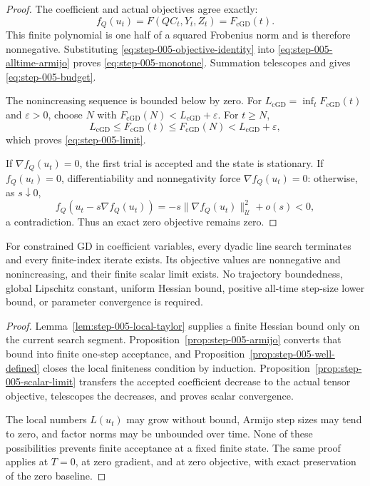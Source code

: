 \begin{proof}
The coefficient and actual objectives agree exactly:
\[
 f_Q(u_t)=F(QC_t,Y_t,Z_t)=F_{\mathrm{cGD}}(t).
 \tag{A.7}\label{eq:step-005-objective-identity}
\]
This finite polynomial is one half of a squared Frobenius norm and is
therefore nonnegative.  Substituting
\eqref{eq:step-005-objective-identity} into
\eqref{eq:step-005-alltime-armijo} proves
\eqref{eq:step-005-monotone}.  Summation telescopes and gives
\eqref{eq:step-005-budget}.

The nonincreasing sequence is bounded below by zero.  For
$L_{\mathrm{cGD}}=\inf_tF_{\mathrm{cGD}}(t)$ and $\varepsilon>0$, choose
$N$ with
$F_{\mathrm{cGD}}(N)<L_{\mathrm{cGD}}+\varepsilon$.  For $t\ge N$,
\[
 L_{\mathrm{cGD}}\le F_{\mathrm{cGD}}(t)
 \le F_{\mathrm{cGD}}(N)<L_{\mathrm{cGD}}+\varepsilon,
\]
which proves \eqref{eq:step-005-limit}.

If $\nabla f_Q(u_t)=0$, the first trial is accepted and the state is
stationary.  If $f_Q(u_t)=0$, differentiability and nonnegativity force
$\nabla f_Q(u_t)=0$: otherwise, as $s\downarrow0$,
\[
 f_Q(u_t-s\nabla f_Q(u_t))
 =-s\|\nabla f_Q(u_t)\|_{\mathcal U}^2+o(s)<0,
\]
a contradiction.  Thus an exact zero objective remains zero.
\end{proof}

\begin{proposition}\label{prop:step-005-certificate}
For constrained GD in coefficient variables, every dyadic line search
terminates and every finite-index iterate exists.  Its objective values are
nonnegative and nonincreasing, and their finite scalar limit exists.  No
trajectory boundedness, global Lipschitz constant, uniform Hessian bound,
positive all-time step-size lower bound, or parameter convergence is required.
\end{proposition}

\begin{proof}
Lemma~\ref{lem:step-005-local-taylor} supplies a finite Hessian bound only on
the current search segment.  Proposition~\ref{prop:step-005-armijo} converts
that bound into finite one-step acceptance, and
Proposition~\ref{prop:step-005-well-defined} closes the local finiteness
condition by induction.  Proposition~\ref{prop:step-005-scalar-limit}
transfers the accepted coefficient decrease to the actual tensor objective,
telescopes the decreases, and proves scalar convergence.

The local numbers $L(u_t)$ may grow without bound, Armijo step sizes may
tend to zero, and factor norms may be unbounded over time.  None of these
possibilities prevents finite acceptance at a fixed finite state.  The same
proof applies at $T=0$, at zero gradient, and at zero objective, with exact
preservation of the zero baseline.
\end{proof}

